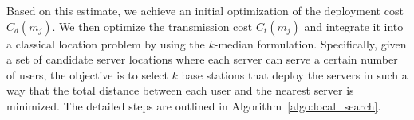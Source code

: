 \documentclass[10pt, conference, letterpaper]{IEEEtran}
\begin{document}
Based on this estimate, we achieve an initial optimization of the deployment cost $C_d(m_j)$. We then optimize the transmission cost $C_t(m_j)$ and integrate it into a classical location problem by using the $k$-median formulation. Specifically, given a set of candidate server locations where each server can serve a certain number of users, the objective is to select $k$ base stations that deploy the servers in such a way that the total distance between each user and the nearest server is minimized. The detailed steps are outlined in Algorithm~\ref{algo:local_search}.
\end{document}
